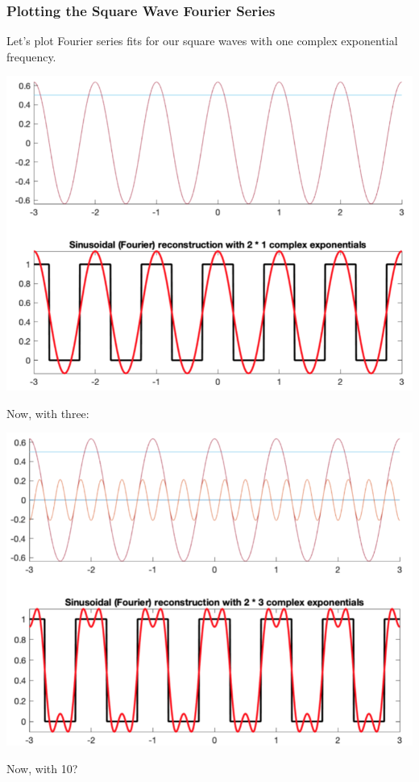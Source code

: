 \documentclass[10pt]{article}
\begin{document}
\subsubsection*{Plotting the Square Wave Fourier Series}
Let's plot Fourier series fits for our square waves with one complex exponential frequency.
\begin{center}
    \includegraphics[scale=0.7]{W4_9.png}
\end{center}
Now, with three:
\begin{center}
    \includegraphics[scale=0.7]{W4_10.png}
\end{center}
\pagebreak
Now, with 10?
\end{document}
